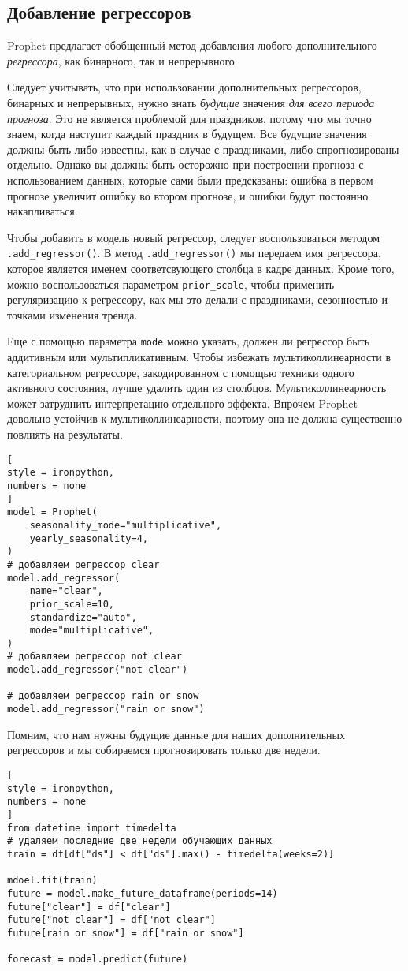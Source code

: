 \documentclass[%
	11pt,
	a4paper,
	utf8,
		]{article}
\begin{document}
\subsection{Добавление регрессоров}

Prophet предлагает обобщенный метод добавления любого дополнительного \emph{регрессора}, как бинарного, так и непрерывного.

Следует учитывать, что при использовании дополнительных регрессоров, бинарных и непрерывных, нужно знать \emph{будущие} значения \emph{для всего периода прогноза}. Это не является проблемой для праздников, потому что мы точно знаем, когда наступит каждый праздник в будущем. Все будущие значения должны быть либо известны, как в случае с праздниками, либо спрогнозированы отдельно. Однако вы должны быть осторожно при построении прогноза с использованием данных, которые сами были предсказаны: ошибка в первом прогнозе увеличит ошибку во втором прогнозе, и ошибки будут постоянно накапливаться.

Чтобы добавить в модель новый регрессор, следует воспользоваться методом \verb|.add_regressor()|. В метод \verb|.add_regressor()| мы передаем имя регрессора, которое является именем соответсвующего столбца в кадре данных. Кроме того, можно воспользоваться параметром \verb|prior_scale|, чтобы применить регуляризацию к регрессору, как мы это делали с праздниками, сезонностью и точками изменения тренда.

Еще с помощью параметра \verb|mode| можно указать, должен ли регрессор быть аддитивным или мультипликативным. Чтобы избежать мультиколлинеарности в категориальном регрессоре, закодированном с помощью техники одного активного состояния, лучше удалить один из столбцов. Мультиколлинеарность может затруднить интерпретацию отдельного эффекта. Впрочем Prophet довольно устойчив к мультиколлинеарности, поэтому она не должна существенно повлиять на результаты.

\begin{lstlisting}[
style = ironpython,
numbers = none
]
model = Prophet(
    seasonality_mode="multiplicative",
    yearly_seasonality=4,
)
# добавляем регрессор clear
model.add_regressor(
    name="clear",
    prior_scale=10,
    standardize="auto",
    mode="multiplicative",
)
# добавляем регрессор not clear
model.add_regressor("not clear")

# добавляем регрессор rain or snow
model.add_regressor("rain or snow")
\end{lstlisting}

Помним, что нам нужны будущие данные для наших дополнительных регрессоров и мы собираемся прогнозировать только две недели.
\begin{lstlisting}[
style = ironpython,
numbers = none
]
from datetime import timedelta
# удаляем последние две недели обучающих данных
train = df[df["ds"] < df["ds"].max() - timedelta(weeks=2)]

mdoel.fit(train)
future = model.make_future_dataframe(periods=14)
future["clear"] = df["clear"]
future["not clear"] = df["not clear"]
future[rain or snow"] = df["rain or snow"]

forecast = model.predict(future)
\end{lstlisting}
\end{document}

